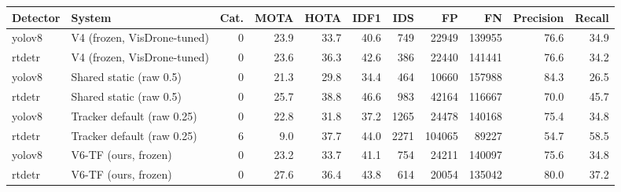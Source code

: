 \begin{tabular}{llrrrrrrrrr}
\toprule
Detector & System & Cat. & MOTA & HOTA & IDF1 & IDS & FP & FN & Precision & Recall \\
\midrule
yolov8 & V4 (frozen, VisDrone-tuned) & 0 & 23.9 & 33.7 & 40.6 & 749 & 22949 & 139955 & 76.6 & 34.9 \\
rtdetr & V4 (frozen, VisDrone-tuned) & 0 & 23.6 & 36.3 & 42.6 & 386 & 22440 & 141441 & 76.6 & 34.2 \\
yolov8 & Shared static (raw 0.5) & 0 & 21.3 & 29.8 & 34.4 & 464 & 10660 & 157988 & 84.3 & 26.5 \\
rtdetr & Shared static (raw 0.5) & 0 & 25.7 & 38.8 & 46.6 & 983 & 42164 & 116667 & 70.0 & 45.7 \\
yolov8 & Tracker default (raw 0.25) & 0 & 22.8 & 31.8 & 37.2 & 1265 & 24478 & 140168 & 75.4 & 34.8 \\
rtdetr & Tracker default (raw 0.25) & 6 & 9.0 & 37.7 & 44.0 & 2271 & 104065 & 89227 & 54.7 & 58.5 \\
yolov8 & V6-TF (ours, frozen) & 0 & 23.2 & 33.7 & 41.1 & 754 & 24211 & 140097 & 75.6 & 34.8 \\
rtdetr & V6-TF (ours, frozen) & 0 & 27.6 & 36.4 & 43.8 & 614 & 20054 & 135042 & 80.0 & 37.2 \\
\bottomrule
\end{tabular}
